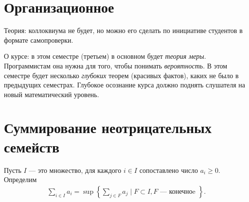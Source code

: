 \section*{Организационное}
Теория: коллоквиума не будет, но можно его сделать по инициативе студентов в формате самопроверки.

О курсе: в этом семестре (третьем) в основном будет \textit{теория меры}. Программистам она нужна для того, чтобы понимать \textit{вероятность}. В этом семестре будет несколько \textit{глубоких} теорем (красивых фактов), каких не было в предыдущих семестрах. Глубокое осознание курса должно поднять слушателя на новый математический уровень.

\section{Суммирование неотрицательных семейств}

\begin{df}
Пусть $ I $ --- это множество, для каждого $ i \in I $ сопоставлено число $ a_i \geqslant 0 $. Определим
\begin{align*}
 \sum_{i \in I} a_i = \sup \left\{ \sum_{j \in F} a_j \mid F \subset I, F \text{ --- конечноe }\right\}
.\end{align*}
\end{df}


